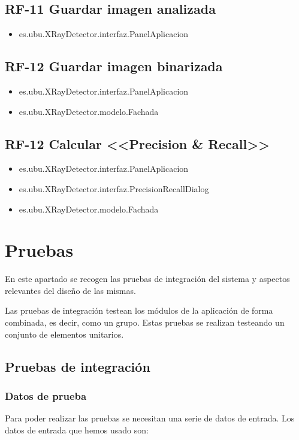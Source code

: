 \subsection{RF-11 Guardar imagen analizada}
\begin{itemize}
\item[] es.ubu.XRayDetector.interfaz.PanelAplicacion
\end{itemize}

\subsection{RF-12 Guardar imagen binarizada}
\begin{itemize}
\item[] es.ubu.XRayDetector.interfaz.PanelAplicacion
\item[] es.ubu.XRayDetector.modelo.Fachada
\end{itemize}

\subsection{RF-12 Calcular <<Precision \& Recall>>}
\begin{itemize}
\item[] es.ubu.XRayDetector.interfaz.PanelAplicacion
\item[] es.ubu.XRayDetector.interfaz.PrecisionRecallDialog
\item[] es.ubu.XRayDetector.modelo.Fachada
\end{itemize}

\section{Pruebas}
En este apartado se recogen las pruebas de integración del sistema y aspectos relevantes del diseño de las mismas.

Las pruebas de integración testean los módulos de la aplicación de forma combinada, es decir, como un grupo. Estas pruebas se realizan testeando un conjunto de elementos unitarios.

\subsection{Pruebas de integración}

\subsubsection{Datos de prueba}
Para poder realizar las pruebas se necesitan una serie de datos de entrada. Los datos de entrada que hemos usado son:

